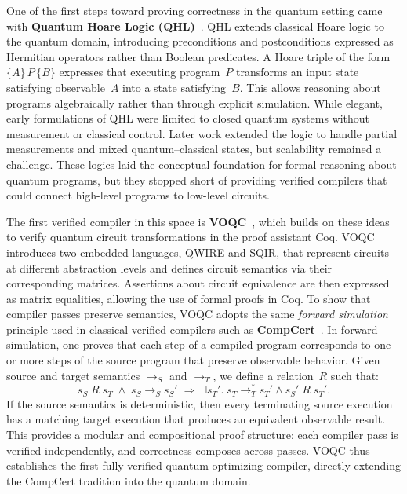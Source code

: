 One of the first steps toward proving correctness in the quantum setting came with \textbf{Quantum Hoare Logic (QHL)}~\cite{ying2019hoare}. 
QHL extends classical Hoare logic\cite{hoare1969axiomatic}  to the quantum domain, introducing preconditions and postconditions expressed as Hermitian operators rather than Boolean predicates.
A Hoare triple of the form $\{A\}\,P\,\{B\}$ expresses that executing program~$P$ transforms an input state satisfying observable~$A$ into a state satisfying~$B$.
This allows reasoning about programs algebraically rather than through explicit simulation.
While elegant, early formulations of QHL were limited to closed quantum systems without measurement or classical control.
Later work\cite{feng2021quantum} extended the logic to handle partial measurements and mixed quantum–classical states, but scalability remained a challenge.
These logics laid the conceptual foundation for formal reasoning about quantum programs, but they stopped short of providing verified compilers that could connect high-level programs to low-level circuits.

\vspace{1em}

The first verified compiler in this space is \textbf{VOQC}~\cite{Hietala_2021}, which builds on these ideas to verify quantum circuit transformations in the proof assistant Coq. 
VOQC introduces two embedded languages, QWIRE and SQIR, that represent circuits at different abstraction levels and defines circuit semantics via their corresponding matrices. 
Assertions about circuit equivalence are then expressed as matrix equalities, allowing the use of formal proofs in Coq.
To show that compiler passes preserve semantics, VOQC adopts the same \emph{forward simulation} principle used in classical verified compilers such as \textbf{CompCert}~\cite{leroy2009compcert}. 
In forward simulation, one proves that each step of a compiled program corresponds to one or more steps of the source program that preserve observable behavior.
Given source and target semantics $\rightarrow_S$ and $\rightarrow_T$, we define a relation~$R$ such that:
\[
  s_S \;R\; s_T \;\wedge\; s_S \rightarrow_S s_S'
  \;\Rightarrow\;
  \exists s_T'.\; s_T \rightarrow_T^* s_T' \wedge s_S' \;R\; s_T' .
\]
If the source semantics is deterministic, then every terminating source execution has a matching target execution that produces an equivalent observable result.
This provides a modular and compositional proof structure: each compiler pass is verified independently, and correctness composes across passes.
VOQC thus establishes the first fully verified quantum optimizing compiler, directly extending the CompCert tradition into the quantum domain.

